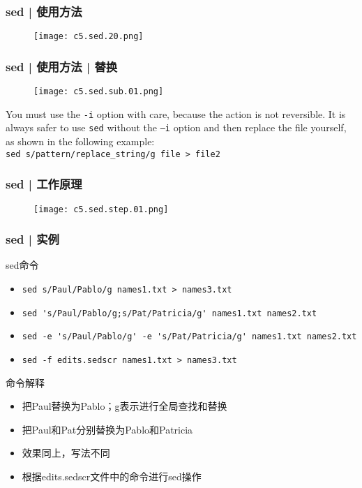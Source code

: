 \begin{frame}
  \frametitle{sed | 使用方法}
  \begin{figure}
    \centering
    \texttt{[image: c5.sed.20.png]}
  \end{figure}
\end{frame}

\begin{frame}[fragile]
  \frametitle{sed | 使用方法 | 替换}
  \begin{figure}
    \centering
    \texttt{[image: c5.sed.sub.01.png]}
  \end{figure}
  You must use the \verb|-i| option with care, because the action is not reversible. It is always safer to use \verb|sed| without the \verb|–i| option and then replace the file yourself, as shown in the following example: \\ \verb|sed s/pattern/replace_string/g file > file2|
\end{frame}

\begin{frame}
  \frametitle{sed | 工作原理}
  \begin{figure}
    \centering
    \texttt{[image: c5.sed.step.01.png]}
  \end{figure}
\end{frame}

\begin{frame}[fragile]
  \frametitle{sed | \alert{实例}}
  \begin{block}{sed命令}
    \begin{itemize}
      \item<2-> \verb|sed s/Paul/Pablo/g names1.txt > names3.txt|
      \item<4-> \verb|sed 's/Paul/Pablo/g;s/Pat/Patricia/g' names1.txt names2.txt|
      \item<6-> \verb|sed -e 's/Paul/Pablo/g' -e 's/Pat/Patricia/g' names1.txt names2.txt|
      \item<8-> \verb|sed -f edits.sedscr names1.txt > names3.txt|
    \end{itemize}
  \end{block}
  \begin{block}{命令解释}
    \begin{itemize}
      \item<3-> 把Paul替换为Pablo；g表示进行全局查找和替换
      \item<5-> 把Paul和Pat分别替换为Pablo和Patricia
      \item<7-> 效果同上，写法不同
      \item<9-> 根据edits.sedscr文件中的命令进行sed操作
    \end{itemize}
  \end{block}
\end{frame}

